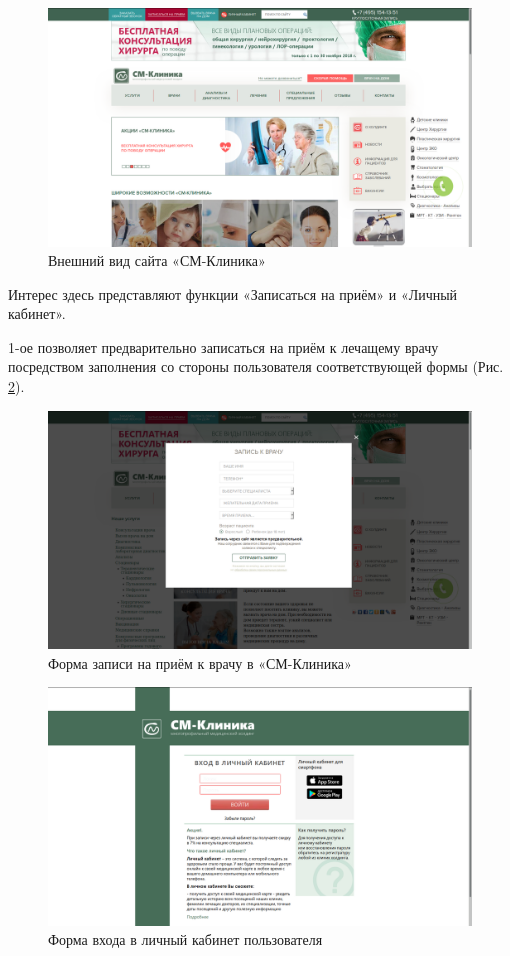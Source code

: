 \documentclass[14pt,a4paper,russian]{extreport}
\begin{document}
\begin{figure}[h!]
        \includegraphics[width=\textwidth]{cmclinic}
        \caption{Внешний вид сайта «СМ-Клиника»}
        \label{fig:cc}
\end{figure}

\noindent Интерес здесь представляют функции «Записаться на приём» и «Личный кабинет». \par
1-ое позволяет предварительно записаться на приём к лечащему врачу посредством заполнения
со стороны пользователя соответствующей формы (Рис. \ref{fig:appdoc}).

\begin{figure}[t!]
        \includegraphics[width=\textwidth]{appdoc}
        \caption{Форма записи на приём к врачу в «СМ-Клиника»}
        \label{fig:appdoc}
\end{figure}

\begin{figure}[b!]
        \includegraphics[width=\textwidth]{lkcm}
        \caption{Форма входа в личный кабинет пользователя}
        \label{fig:lkcm}
\end{figure}
\end{document}
